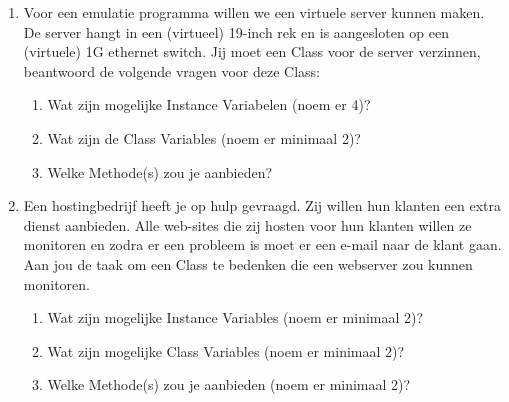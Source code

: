 \begin{enumerate}
\item Voor een emulatie programma willen we een virtuele server kunnen maken. De server hangt in een (virtueel) 19-inch rek en is aangesloten op een (virtuele) 1G ethernet switch. Jij moet een Class voor de server verzinnen, beantwoord de volgende vragen voor deze Class:
	\begin{enumerate}
	\item Wat zijn mogelijke Instance Variabelen (noem er 4)?
	\item Wat zijn de Class Variables (noem er minimaal 2)?
	\item Welke Methode(s) zou je aanbieden?
	\end{enumerate}

\item Een hostingbedrijf heeft je op hulp gevraagd. Zij willen hun klanten een extra dienst aanbieden. Alle web-sites die zij hosten voor hun klanten willen ze monitoren en zodra er een probleem is moet er een e-mail naar de klant gaan. Aan jou de taak om een Class te bedenken die een webserver zou kunnen monitoren.
	\begin{enumerate}
		\item Wat zijn mogelijke Instance Variables (noem er minimaal 2)?
		\item Wat zijn mogelijke Class Variables (noem er minimaal 2)?
		\item Welke Methode(s) zou je aanbieden (noem er minimaal 2)?
	\end{enumerate}

\end{enumerate}

